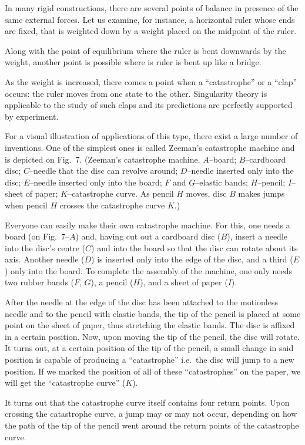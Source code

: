 \documentclass[12pt]{amsart}
\begin{document}
In many rigid constructions, there are several points of balance in presence of
the same external forces.
Let us examine, for instance, a horizontal ruler whose ends are fixed, that is
weighted down by a weight placed on the midpoint of the ruler.

Along with the point of equilibrium where the ruler is bent downwards by the weight,
another point is possible where is ruler is bent up like a bridge.

As the weight is increased, there comes a point when a ``catastrophe'' or a
``clap'' occurs: the ruler moves from one state to the other.
Singularity theory is applicable to the study of such claps and its predictions
are perfectly supported by experiment.

For a visual illustration of applications of this type, there exist a large
number of inventions.
One of the simplest ones is called Zeeman's catastrophe machine and is depicted
on Fig.~7.
(Zeeman's catastrophe machine.
$A$--board; $B$--cardboard disc; $C$--needle that the disc can revolve around;
$D$--needle inserted only into the disc; $E$--needle inserted only into the
board; $F$ and $G$--elastic bands; $H$--pencil; $I$--sheet of paper;
$K$--catastrophe curve.
As pencil $H$ moves, disc $B$ makes jumps when pencil $H$ crosses the
catastrophe curve $K$.)

Everyone can easily make their own catastrophe machine.
For this, one needs a board (on Fig.~7--$A$) and, having cut out a cardboard
disc ($B$), insert a needle into the disc's centre ($C$) and into the board so
that the disc can rotate about its axis.
Another needle ($D$) is inserted only into the edge of the disc, and a third
($E$) only into the board.
To complete the assembly of the machine, one only needs two rubber bands ($F$,
$G$), a pencil ($H$), and a sheet of paper ($I$).

After the needle at the edge of the disc has been attached to the motionless
needle and to the pencil with elastic bands, the tip of the pencil is placed at
some point on the sheet of paper, thus stretching the elastic bands.
The disc is affixed in a certain position.
Now, upon moving the tip of the pencil, the disc will rotate.
It turns out, at a certain position of the tip of the pencil, a small change in
said position is capable of producing a ``catastrophe'' i.e.~the disc will jump
to a new position.
If we marked the position of all of these ``catastrophes'' on the paper, we will
get the ``catastrophe curve'' ($K$).

It turns out that the catastrophe curve itself contains four return points.
Upon crossing the catastrophe curve, a jump may or may not occur, depending on
how the path of the tip of the pencil went around the return points of the
catastrophe curve.
\end{document}
